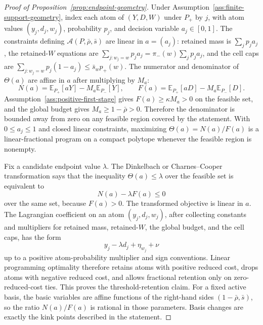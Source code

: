 \documentclass[11pt]{article}
\newcommand{\E}{\mathbb{E}}
\theoremstyle{definition}
\theoremstyle{plain}
\theoremstyle{remark}
\begin{document}
\begin{proof}[Proof of Proposition~\ref{prop:endpoint-geometry}]
Under Assumption~\ref{ass:finite-support-geometry}, index each atom of
\((Y,D,W)\) under \(P_+\) by \(j\), with atom values \((y_j,d_j,w_j)\), probability
\(p_j\), and decision variable \(a_j\in[0,1]\).  The constraints defining
\(\mathcal A(P,\bar\rho,\bar s)\) are linear in \(a=(a_j)\): retained mass is
\(\sum_j p_ja_j\), the retained-\(W\) equations are
\(\sum_{j:w_j=w}p_ja_j=\pi_-(w)\sum_jp_ja_j\), and the cell caps are
\(\sum_{j:w_j=w}p_j(1-a_j)\le \bar s_w p_+(w)\).  The numerator and denominator of
\(\Theta(a)\) are affine in \(a\) after multiplying by \(M_a\):
\[
  N(a)=\E_{P_+}[aY]-M_a\E_{P_-}[Y],\qquad
  F(a)=\E_{P_+}[aD]-M_a\E_{P_-}[D].
\]
Assumption~\ref{ass:positive-first-stage} gives \(F(a)\ge \kappa M_a>0\) on the feasible
set, and the global budget gives \(M_a\ge1-\bar\rho>0\).  Therefore the denominator is
bounded away from zero on any feasible region covered by the statement.  With
\(0\le a_j\le1\) and closed linear constraints, maximizing \(\Theta(a)=N(a)/F(a)\) is a
linear-fractional program on a compact polytope whenever the feasible region is nonempty.

Fix a candidate endpoint value \(\lambda\).  The Dinkelbach or Charnes--Cooper
transformation says that the inequality \(\Theta(a)\le\lambda\) over the feasible set is
equivalent to
\[
  N(a)-\lambda F(a)\le0
\]
over the same set, because \(F(a)>0\).  The transformed objective is linear in \(a\).
The Lagrangian coefficient on an atom \((y_j,d_j,w_j)\), after collecting constants and
multipliers for retained mass, retained-\(W\), the global budget, and the cell caps, has
the form
\[
  y_j-\lambda d_j+\eta_{w_j}+\nu
\]
up to a positive atom-probability multiplier and sign conventions.  Linear programming
optimality therefore retains atoms with positive reduced cost, drops atoms with negative
reduced cost, and allows fractional retention only on zero-reduced-cost ties.  This proves
the threshold-retention claim.  For a fixed active basis, the basic variables are affine
functions of the right-hand sides \((1-\bar\rho,\bar s)\), so the ratio \(N(a)/F(a)\) is
rational in those parameters.  Basis changes are exactly the kink points described in the
statement.
\end{proof}
\end{document}
